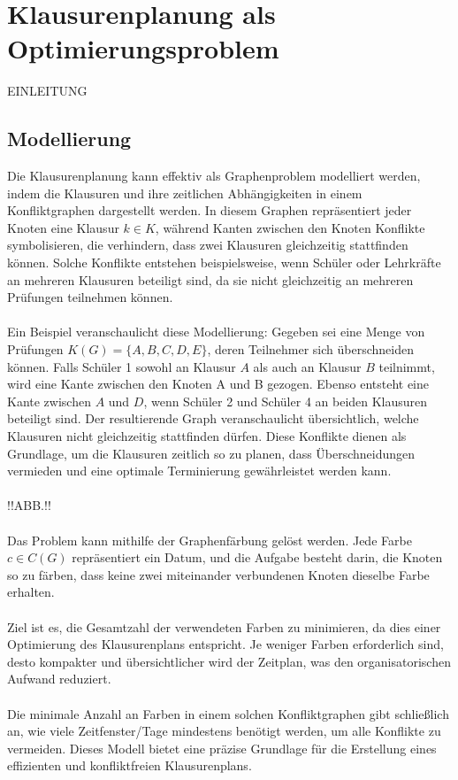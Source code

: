 \newpage
\section{Klausurenplanung als Optimierungsproblem}
EINLEITUNG
\subsection{Modellierung}
Die Klausurenplanung kann effektiv als Graphenproblem modelliert werden, indem die Klausuren und ihre zeitlichen Abhängigkeiten in einem Konfliktgraphen dargestellt werden. In diesem Graphen repräsentiert jeder Knoten eine Klausur $k \in K$, während Kanten zwischen den Knoten Konflikte symbolisieren, die verhindern, dass zwei Klausuren gleichzeitig stattfinden können. Solche Konflikte entstehen beispielsweise, wenn Schüler oder Lehrkräfte an mehreren Klausuren beteiligt sind, da sie nicht gleichzeitig an mehreren Prüfungen teilnehmen können.\\\\
Ein Beispiel veranschaulicht diese Modellierung: Gegeben sei eine Menge von Prüfungen $K(G) = \{A,B,C,D,E\} $, deren Teilnehmer sich überschneiden können. Falls Schüler 1 sowohl an Klausur $A$ als auch an Klausur $B$ teilnimmt, wird eine Kante zwischen den Knoten A und B gezogen. Ebenso entsteht eine Kante zwischen $A$ und $D$, wenn Schüler 2 und Schüler 4 an beiden Klausuren beteiligt sind.
Der resultierende Graph veranschaulicht übersichtlich, welche Klausuren nicht gleichzeitig stattfinden dürfen. Diese Konflikte dienen als Grundlage, um die Klausuren zeitlich so zu planen, dass Überschneidungen vermieden und eine optimale Terminierung gewährleistet werden kann.\\\\
!!ABB.!!\\\\
Das Problem kann mithilfe der Graphenfärbung gelöst werden. Jede Farbe $ c \in C(G)$ repräsentiert ein Datum, und die Aufgabe besteht darin, die Knoten so zu färben, dass keine zwei miteinander verbundenen Knoten dieselbe Farbe erhalten. \\\\
Ziel ist es, die Gesamtzahl der verwendeten Farben zu minimieren, da dies einer Optimierung des Klausurenplans entspricht. Je weniger Farben erforderlich sind, desto kompakter und übersichtlicher wird der Zeitplan, was den organisatorischen Aufwand reduziert.\\\\
Die minimale Anzahl an Farben in einem solchen Konfliktgraphen gibt schließlich an, wie viele Zeitfenster/Tage mindestens benötigt werden, um alle Konflikte zu vermeiden. Dieses Modell bietet eine präzise Grundlage für die Erstellung eines effizienten und konfliktfreien Klausurenplans.\\\\
